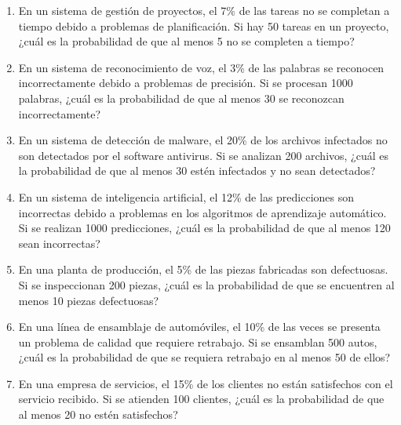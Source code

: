 \begin{Ejer}
\begin{enumerate}
    \item En un sistema de gestión de proyectos, el 7\% de las tareas no se completan a tiempo debido a problemas de planificación. Si hay 50 tareas en un proyecto, ¿cuál es la probabilidad de que al menos 5 no se completen a tiempo?

    \item En un sistema de reconocimiento de voz, el 3\% de las palabras se reconocen incorrectamente debido a problemas de precisión. Si se procesan 1000 palabras, ¿cuál es la probabilidad de que al menos 30 se reconozcan incorrectamente?

    \item En un sistema de detección de malware, el 20\% de los archivos infectados no son detectados por el software antivirus. Si se analizan 200 archivos, ¿cuál es la probabilidad de que al menos 30 estén infectados y no sean detectados?

    \item En un sistema de inteligencia artificial, el 12\% de las predicciones son incorrectas debido a problemas en los algoritmos de aprendizaje automático. Si se realizan 1000 predicciones, ¿cuál es la probabilidad de que al menos 120 sean incorrectas?

    \item En una planta de producción, el 5\% de las piezas fabricadas son defectuosas. Si se inspeccionan 200 piezas, ¿cuál es la probabilidad de que se encuentren al menos 10 piezas defectuosas?

    \item En una línea de ensamblaje de automóviles, el 10\% de las veces se presenta un problema de calidad que requiere retrabajo. Si se ensamblan 500 autos, ¿cuál es la probabilidad de que se requiera retrabajo en al menos 50 de ellos?

    \item En una empresa de servicios, el 15\% de los clientes no están satisfechos con el servicio recibido. Si se atienden 100 clientes, ¿cuál es la probabilidad de que al menos 20 no estén satisfechos?

\end{enumerate}
\end{Ejer} 



